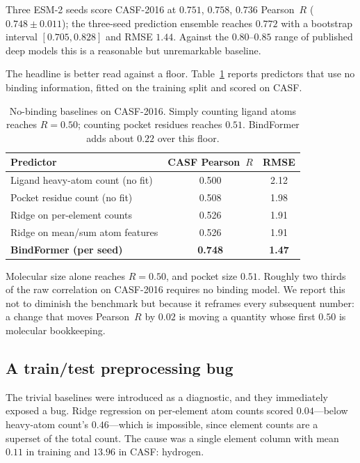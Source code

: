 \documentclass[11pt]{article}
\newcommand{\pearson}{Pearson~$R$}
\begin{document}
Three ESM-2 seeds score CASF-2016 at $0.751$, $0.758$, $0.736$ \pearson{}
($0.748\pm0.011$); the three-seed prediction ensemble reaches $0.772$ with a bootstrap
interval $[0.705, 0.828]$ and RMSE $1.44$. Against the $0.80$--$0.85$ range of published
deep models this is a reasonable but unremarkable baseline.

The headline is better read against a floor. Table~\ref{tab:trivial} reports predictors
that use no binding information, fitted on the training split and scored on CASF.

\begin{table}[t]
\centering
\begin{tabular}{lcc}
\toprule
Predictor & CASF \pearson{} & RMSE \\
\midrule
Ligand heavy-atom count (no fit)     & 0.500 & 2.12 \\
Pocket residue count (no fit)        & 0.508 & 1.98 \\
Ridge on per-element counts          & 0.526 & 1.91 \\
Ridge on mean/sum atom features      & 0.526 & 1.91 \\
\textbf{BindFormer (per seed)}       & \textbf{0.748} & \textbf{1.47} \\
\bottomrule
\end{tabular}
\caption{No-binding baselines on CASF-2016. Simply counting ligand atoms reaches
$R=0.50$; counting pocket residues reaches $0.51$. BindFormer adds about $0.22$ over this
floor.}
\label{tab:trivial}
\end{table}

Molecular size alone reaches $R=0.50$, and pocket size $0.51$. Roughly two thirds of the
raw correlation on CASF-2016 requires no binding model. We report this not to diminish the
benchmark but because it reframes every subsequent number: a change that moves \pearson{}
by $0.02$ is moving a quantity whose first $0.50$ is molecular bookkeeping.

\subsection{A train/test preprocessing bug}
\label{sec:bug}

The trivial baselines were introduced as a diagnostic, and they immediately exposed a bug.
Ridge regression on per-element atom counts scored $0.04$---below heavy-atom count's
$0.46$---which is impossible, since element counts are a superset of the total count. The
cause was a single element column with mean $0.11$ in training and $13.96$ in CASF:
hydrogen.
\end{document}
